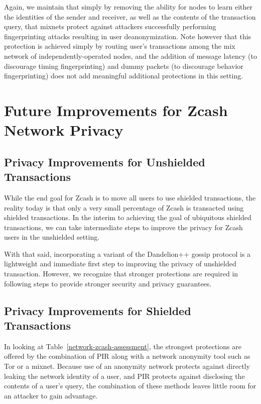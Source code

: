 \documentclass{article}
\begin{document}
Again, we maintain that simply
by removing the ability for nodes to learn either the identities of the sender
and receiver, as well as the contents of the transaction query, that mixnets
protect against attackers successfully performing fingerprinting attacks
resulting in user deanonymization. Note however that this protection is
achieved simply by routing user's transactions among the mix network of
independently-operated nodes, and the addition of message latency (to
discourage timing fingerprinting) and dummy packets (to discourage behavior
fingerprinting) does not add meaningful additional protections in this setting.

\section{Future Improvements for Zcash Network Privacy}
\label{future-improvements}

\subsection{Privacy Improvements for Unshielded Transactions}

While the end goal for Zcash is to move all users to use shielded transactions,
the reality today is that only a very small percentage of Zcash is transacted
using shielded transactions. In the interim to achieving the goal of
ubiquitous shielded transactions, we can take intermediate steps to improve
the privacy for Zcash users in the unshielded setting.

With that said, incorporating a variant of the Dandelion++ gossip protocol is a
lightweight and immediate first step to improving the privacy of unshielded
transaction. However, we recognize that stronger protections are required in
following steps to provide stronger security and privacy guarantees.

\subsection{Privacy Improvements for Shielded Transactions}

In looking at Table~\ref{network-zcash-assessment}, the strongest protections
are offered by the combination of PIR along with a network anonymity tool such
as Tor or a mixnet. Because use of an anonymity network protects against
directly leaking the network identity of a user, and PIR protects against
disclosing the contents of a user's query, the combination of these methods
leaves little room for an attacker to gain advantage.
\end{document}
